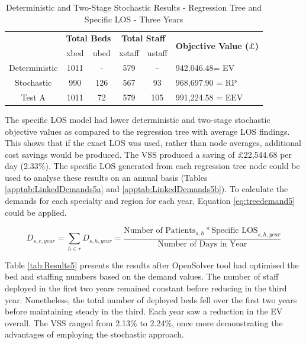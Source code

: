 \documentclass[../thesis.tex]{subfiles}
\begin{document}
\begin{table}[h!]
    \centering
    \begin{tabular}{cccccl}\toprule
 & \multicolumn{2}{l}{\textbf{Total Beds}} & \multicolumn{2}{c}{\textbf{Total Staff}} & \multirow{2}{*}{\textbf{Objective Value ($\pounds$)}}\\ \cmidrule(lr){2-3} \cmidrule(lr){4-5}
 & xbed           & ubed          & xstaff         & ustaff         \\ \midrule
    Deterministic      & 1011 & - & 579 & - & 942,046.48= EV \\ \midrule
    Stochastic &990&126 & 567 & 93&  968,697.90 = RP \\ \midrule
    Test A & 1011 & 72 & 579 & 105 & 991,224.58 = EEV \\\bottomrule
    \end{tabular}
    \caption{Deterministic and Two-Stage Stochastic Results - Regression Tree and Specific LOS - Three Years}
    \label{tab:Results4}
\end{table}

The specific LOS model had lower deterministic and two-stage stochastic objective values as compared to the regression tree with average LOS findings. This shows that if the exact LOS was used, rather than node averages, additional cost savings would be produced. The VSS produced a saving of $\pounds$22,544.68 per day (2.33\%). The specific LOS generated from each regression tree node could be used to analyse these results on an annual basis (Tables \ref{apptab:LinkedDemands5a} and \ref{apptab:LinkedDemands5b}). To calculate the demands for each specialty and region for each year, Equation \eqref{eq:treedemand5} could be applied.

\begin{equation}\label{eq:treedemand5}
        D_{s,r,year} = \sum\limits_{h \in r} D_{s,h,year} = \frac{\text{Number of Patients}_{s,h}*{\text{Specific LOS}_{s,h,year}}}{{\text{Number of Days in Year}}}
\end{equation}

Table \ref{tab:Results5} presents the results after OpenSolver tool had optimised the bed and staffing numbers based on the demand values. The number of staff deployed in the first two years remained constant before reducing in the third year. Nonetheless, the total number of deployed beds fell over the first two years before maintaining steady in the third. Each year saw a reduction in the EV overall. The VSS ranged from 2.13\% to 2.24\%, once more demonstrating the advantages of employing the stochastic approach.
\end{document}
